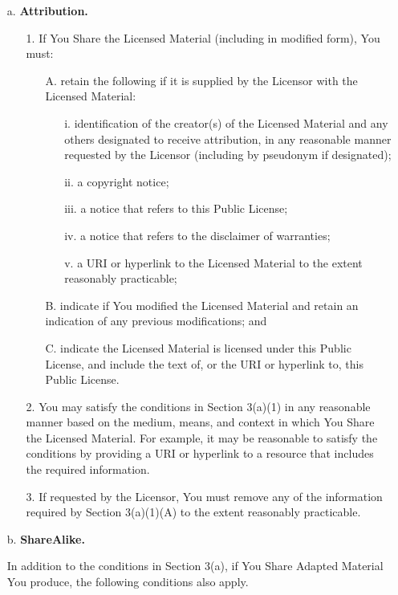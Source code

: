 \begin{itemize}
    \item[a.] \textbf{Attribution.}
    \begin{itemize}
        \item[1.] If You Share the Licensed Material (including in modified form), You must:
        \begin{itemize}
            \item[A.] retain the following if it is supplied by the Licensor with the Licensed Material:
            \begin{itemize}
                \item[i.] identification of the creator(s) of the Licensed Material and any others designated to receive attribution, in any reasonable manner requested by the Licensor (including by pseudonym if designated);
                \item[ii.] a copyright notice;
                \item[iii.] a notice that refers to this Public License;
                \item[iv.] a notice that refers to the disclaimer of warranties;
                \item[v.] a URI or hyperlink to the Licensed Material to the extent reasonably practicable;
            \end{itemize}
            \item[B.] indicate if You modified the Licensed Material and retain an indication of any previous modifications; and
            \item[C.] indicate the Licensed Material is licensed under this Public License, and include the text of, or the URI or hyperlink to, this Public License.
        \end{itemize}
        \item[2.] You may satisfy the conditions in Section 3(a)(1) in any reasonable manner based on the medium, means, and context in which You Share the Licensed Material. For example, it may be reasonable to satisfy the conditions by providing a URI or hyperlink to a resource that includes the required information.
        \item[3.] If requested by the Licensor, You must remove any of the information required by Section 3(a)(1)(A) to the extent reasonably practicable.
    \end{itemize}
    \item[b.] \textbf{ShareAlike.}

     In addition to the conditions in Section 3(a), if You Share Adapted Material You produce, the following conditions also apply.


\end{itemize}
